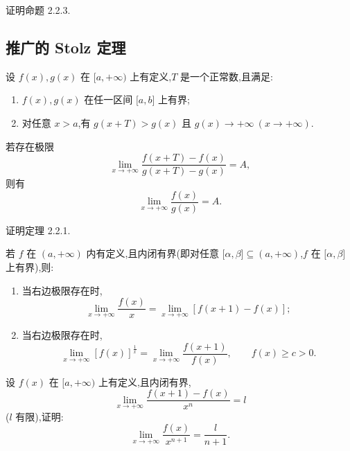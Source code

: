 \documentclass[../数学分析培优讲义.tex]{subfiles}
\begin{document}
\begin{example}
证明命题 2.2.3.
\end{example}
\exampleblank


\newpage

\subsection{推广的 Stolz 定理}

\begin{theorem}
设 $f(x),g(x)$ 在 $\lbrack a,+\infty)$ 上有定义,$T$ 是一个正常数,且满足:
\begin{enumerate}[label=(\arabic*)]
    \item $f(x),g(x)$ 在任一区间 $\lbrack a,b\rbrack$ 上有界;
    \item 对任意 $x>a$,有 $g(x+T)>g(x)$ 且 $g(x)\to+\infty\ (x\to+\infty)$.
\end{enumerate}
若存在极限
\[
    \lim\limits_{x\to+\infty}
    \dfrac{f(x+T)-f(x)}{g(x+T)-g(x)}=A,
\]
则有
\[
    \lim\limits_{x\to+\infty}\dfrac{f(x)}{g(x)}=A.
\]
\end{theorem}

\begin{example}
证明定理 2.2.1.
\end{example}
\exampleblank

\begin{example}[Cauchy 定理]
若 $f$ 在 $(a,+\infty)$ 内有定义,且内闭有界(即对任意 $\lbrack \alpha,\beta\rbrack\subseteq(a,+\infty)$,$f$ 在 $\lbrack \alpha,\beta\rbrack$ 上有界),则:
\begin{enumerate}[label=(\arabic*)]
    \item 当右边极限存在时,
    \[
        \lim\limits_{x\to+\infty}\dfrac{f(x)}{x}
        =\lim\limits_{x\to+\infty}[f(x+1)-f(x)];
    \]
    \item 当右边极限存在时,
    \[
        \lim\limits_{x\to+\infty}[f(x)]^{\frac{1}{x}}
        =\lim\limits_{x\to+\infty}\dfrac{f(x+1)}{f(x)},
        \qquad f(x)\geq c>0.
    \]
\end{enumerate}
\end{example}
\exampleblank

\begin{example}
设 $f(x)$ 在 $\lbrack a,+\infty)$ 上有定义,且内闭有界,
\[
    \lim\limits_{x\to+\infty}
    \dfrac{f(x+1)-f(x)}{x^n}=l
\]
($l$ 有限),证明:
\[
    \lim\limits_{x\to+\infty}\dfrac{f(x)}{x^{n+1}}
    =\dfrac{l}{n+1}.
\]
\end{example}
\exampleblank
\end{document}
